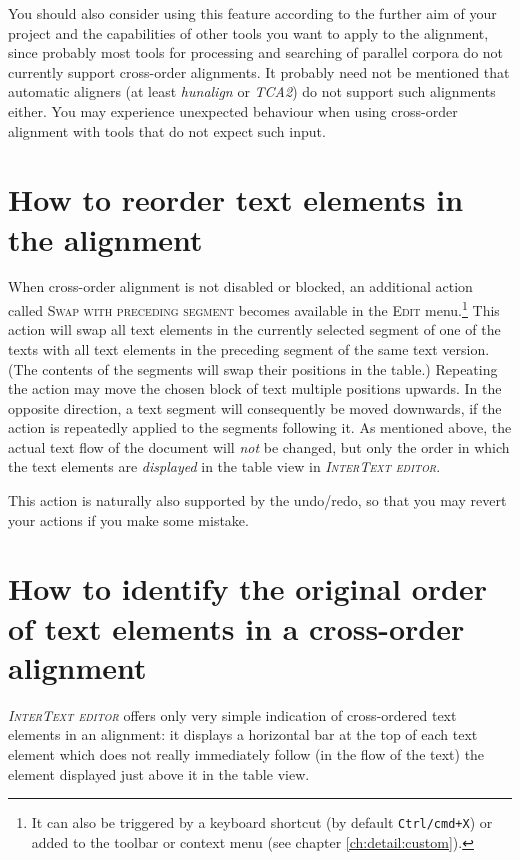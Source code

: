 \documentclass[a4paper,10pt,oneside]{book}
\newcommand{\ITeditor}{\textit{\textsc{InterText editor}}\xspace}
\newcommand{\keys}[1]{\texttt{#1}}
\newcommand{\menu}[1]{\textsc{#1}}
\begin{document}
You should also consider using this feature according to the further aim of your project and the capabilities of other tools you want to apply to the alignment, since probably most tools for processing and searching of parallel corpora do not currently support cross-order alignments. It probably need not be mentioned that automatic aligners (at least \emph{hunalign} or \emph{TCA2}) do not support such alignments either. You may experience unexpected behaviour when using cross-order alignment with tools that do not expect such input.

\section{How to reorder text elements in the alignment}\label{ch:detail:crossorder:swap}

When cross-order alignment is not disabled or blocked, an additional action called \menu{Swap with preceding segment} becomes available in the \menu{Edit} menu.\footnote{It can also be triggered by a keyboard shortcut (by default \keys{Ctrl/cmd+X}) or added to the toolbar or context menu (see chapter \ref{ch:detail:custom}).} This action will swap all text elements in the currently selected segment of one of the texts with all text elements in the preceding segment of the same text version. (The contents of the segments will swap their positions in the table.) Repeating the action may move the chosen block of text multiple positions upwards. In the opposite direction, a text segment will consequently be moved downwards, if the action is repeatedly applied to the segments following it. As mentioned above, the actual text flow of the document will \emph{not} be changed, but only the order in which the text elements are \emph{displayed} in the table view in \ITeditor.

This action is naturally also supported by the undo/redo, so that you may revert your actions if you make some mistake.

\section[How to identify the original order]{How to identify the original order of text elements in a cross-order alignment}\label{ch:detail:crossorder:visualization}

\ITeditor offers only very simple indication of cross-ordered text elements in an alignment: it displays a horizontal bar at the top of each text element which does not really immediately follow (in the flow of the text) the element displayed just above it in the table view.
\end{document}
